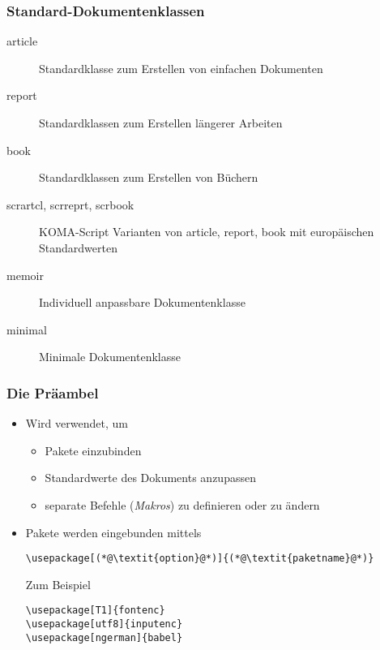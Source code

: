 \begin{frame}
  \frametitle{Standard-Dokumentenklassen}

  \begin{description}
  \item[article] Standardklasse zum Erstellen von einfachen Dokumenten
  \item[report] Standardklassen zum Erstellen längerer Arbeiten
  \item[book] Standardklassen zum Erstellen von Büchern
  \item[scrartcl, scrreprt, scrbook] KOMA-Script Varianten von article, report, book mit
    europäischen Standardwerten
  \item[memoir] Individuell anpassbare Dokumentenklasse
  \item[minimal] Minimale Dokumentenklasse
  \end{description}

\end{frame}

\begin{frame}[fragile]
  \frametitle{Die Präambel}


  \begin{itemize}
  \item<1-> Wird verwendet, um
    \begin{itemize}
    \item<2-> Pakete einzubinden
    \item<3-> Standardwerte des Dokuments anzupassen
    \item<4-> separate Befehle (\emph{Makros}) zu definieren oder zu ändern
    \end{itemize}
  \item<5-> Pakete werden eingebunden mittels
\begin{lstlisting}
\usepackage[(*@\textit{option}@*)]{(*@\textit{paketname}@*)}
\end{lstlisting}
    Zum Beispiel
\begin{lstlisting}
\usepackage[T1]{fontenc}
\usepackage[utf8]{inputenc}
\usepackage[ngerman]{babel}
\end{lstlisting}
  \end{itemize}

\end{frame}

